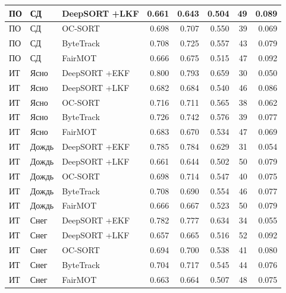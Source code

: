 \begin{longtable}{|p{2.42cm}|p{1.8cm}|p{2.4cm}|r|r|r|r|r|}
       ПО     &      СД & DeepSORT +LKF & 0.661 & 0.643 & 0.504 &   49 & 0.089                              \\ \hline
       ПО     &      СД &      OC-SORT & 0.698 & 0.707 & 0.550 &   39 & 0.069                               \\ \hline
       ПО     &      СД &    ByteTrack & 0.708 & 0.725 & 0.557 &   43 & 0.079                               \\ \hline
       ПО     &      СД &      FairMOT & 0.666 & 0.675 & 0.515 &   47 & 0.092                               \\ \hline
       ИТ     &      Ясно & DeepSORT +EKF & 0.800 & 0.793 & 0.659 &   30 & 0.050        \\ \hline
       ИТ     &      Ясно & DeepSORT +LKF & 0.682 & 0.684 & 0.540 &   46 & 0.086        \\ \hline
       ИТ     &      Ясно &      OC-SORT & 0.716 & 0.711 & 0.565 &   38 & 0.062         \\ \hline
       ИТ     &      Ясно &    ByteTrack & 0.726 & 0.742 & 0.576 &   39 & 0.077         \\ \hline
       ИТ     &      Ясно &      FairMOT & 0.683 & 0.670 & 0.534 &   47 & 0.069         \\ \hline
       ИТ     &      Дождь & DeepSORT +EKF & 0.785 & 0.784 & 0.629 &   31 & 0.054      \\ \hline
       ИТ     &      Дождь & DeepSORT +LKF & 0.661 & 0.644 & 0.502 &   50 & 0.079      \\ \hline
       ИТ     &      Дождь &      OC-SORT & 0.698 & 0.714 & 0.547 &   40 & 0.075       \\ \hline
       ИТ     &      Дождь &    ByteTrack & 0.708 & 0.690 & 0.554 &   46 & 0.077       \\ \hline
       ИТ     &      Дождь &      FairMOT & 0.666 & 0.667 & 0.523 &   50 & 0.079       \\ \hline
       ИТ     &      Снег & DeepSORT +EKF & 0.782 & 0.777 & 0.634 &   34 & 0.055       \\ \hline
       ИТ     &      Снег & DeepSORT +LKF & 0.657 & 0.665 & 0.516 &   52 & 0.092       \\ \hline
       ИТ     &      Снег &      OC-SORT & 0.694 & 0.700 & 0.538 &   41 & 0.080        \\ \hline
       ИТ     &      Снег &    ByteTrack & 0.704 & 0.717 & 0.545 &   44 & 0.076        \\ \hline
       ИТ     &      Снег &      FairMOT & 0.663 & 0.664 & 0.507 &   48 & 0.075        \\ \hline

\end{longtable}
